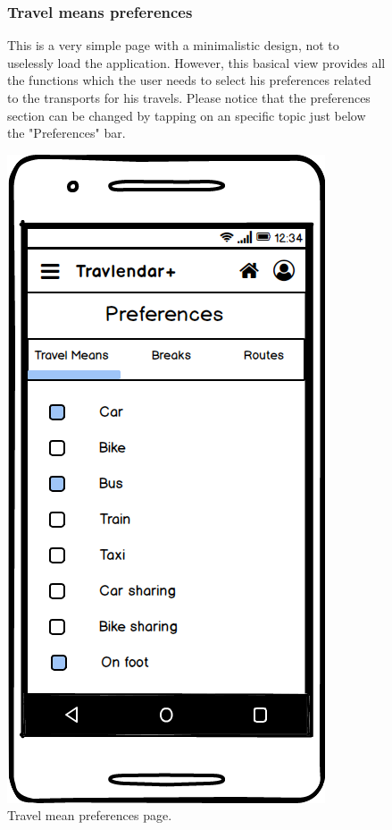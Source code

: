 	\begin{figure}
				\begin{flushleft}
				\subsubsection{Travel means preferences}
			This is a very simple page with a minimalistic design, not to uselessly load the application. However, this basical view provides all the functions which the user needs to select his preferences related to the transports for his travels. 
			Please notice that the preferences section can be changed by tapping on an specific topic just below the "Preferences" bar.
		\end{flushleft}
		\centering
		\includegraphics[width=0.6\linewidth]{mockups/PreferencesTravelMeans}
		\caption{Travel mean preferences page.}
		\label{fig:preferencestravelmeans}
	\end{figure}

